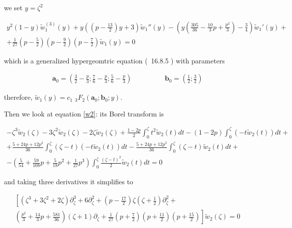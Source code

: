 \documentclass{article}
\theoremstyle{definition}
\begin{document}
we set $y=\zeta^2$

\begin{multline}\label{eq:hw1}
y^2(1-y)\tilde{w}_1^{(3)}(y)+y\left((p-\frac{13}{2})y+3\right)\tilde{w}_1''(y)-\left(y\left(\frac{305}{36}-\frac{10}{3}p+\frac{p^2}{3}\right)-\frac{3}{4}\right)\tilde{w}_1'(y)+\\
+\frac{1}{27}\left(p-\frac{5}{2}\right)\left(p-\frac{9}{2}\right)\left(p-\frac{7}{2}\right)\tilde{w}_1(y)=0
\end{multline}

which is a generalized hypergeomtric equation (~16.8.5 \cite{dlmf}) with parameters



\begin{align*}
\mathbf{a}_0=\left(\frac{3}{2}-\frac{p}{3};\frac{7}{6}-\frac{p}{3};\frac{5}{6}-\frac{p}{3}\right) & \qquad\qquad \mathbf{b}_0=\left(\frac{1}{2};\frac{3}{2}\right)
\end{align*}

therefore, $\tilde{w}_1(y)=c_1\,\,{}_3F_2\left(\mathbf{a}_0;\mathbf{b}_0;y\right)$. 

  

Then we look at equation \eqref{w2}: its Borel transform is

\begin{multline}
-\zeta^3\tilde{w}_2(\zeta)-3\zeta^2\tilde{w}_2(\zeta)-2\zeta\tilde{w}_2(\zeta)+\frac{1-2p}{2}\int_0^\zeta t^2\tilde{w}_2(t)dt-(1-2p)\int_0^\zeta(-t\tilde{w}_2(t))dt+\\
+\frac{5+24p+12p^2}{36}\int_0^\zeta(\zeta-t)(-t\tilde{w}_2(t))dt
-\frac{5+24p+12p^2}{36}\int_0^\zeta(\zeta-t)\tilde{w}_2(t)dt +\\
-\left(\frac{5}{54}+\frac{59}{108}p+\frac{5}{18}p^2+\frac{1}{27}p^3\right)\int_0^\zeta\frac{(\zeta-t)^2}{2}\tilde{w}_2(t)dt=0
\end{multline} 

and taking three derivatives it simplifies to 

\begin{multline}
\left[\left(\zeta^3+3\zeta^2+2\zeta\right)\partial_\zeta^3 +6\partial_\zeta^2+\left(p-\frac{17}{2}\right)\zeta\left(\zeta+\frac{1}{2}\right)\partial_\zeta^2+\right.\\
\left. \left(\frac{p^2}{3}+\frac{14}{3}p+\frac{581}{36}\right)\left(\zeta+1\right)\partial_\zeta+\frac{1}{27}\left(p+\frac{7}{2}\right)\left(p+\frac{11}{2}\right)\left(p+\frac{15}{2}\right)\right]\tilde{w}_2(\zeta)=0
\end{multline}
\end{document}
